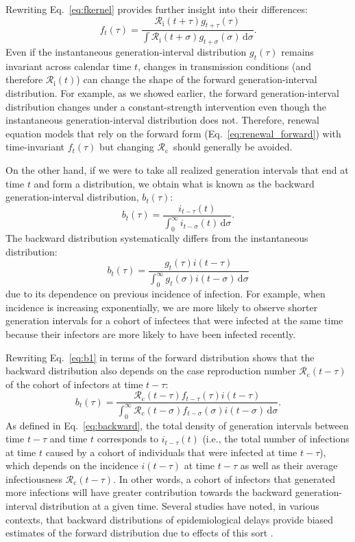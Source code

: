 \documentclass[12pt]{article}
\newcommand{\eref}[1]{Eq.~\ref{eq:#1}}
\newcommand{\Rx}[1]{\ensuremath{{\mathcal R}_{#1}}\xspace}
\newcommand{\Rc}{\Rx{\mathrm{c}}}
\newcommand{\Ri}{\Rx{\mathrm{i}}}
\newcommand{\dd}[1]{\ensuremath{\, \mathrm{d}#1}}
\newcommand{\dsigma}{\dd{\sigma}}
\begin{document}
Rewriting \eref{fkernel} provides further insight into their differences:
\begin{equation}
f_t(\tau) = \frac{\Ri(t + \tau) g_{t+\tau}(\tau)}{\int \Ri(t + \sigma) g_{t+\sigma}(\sigma) \dsigma}.
\end{equation}
Even if the instantaneous generation-interval distribution $g_t(\tau)$ remains invariant across calendar time $t$, changes in transmission conditions (and therefore $\Ri(t)$) can change the shape of the forward generation-interval distribution.
For example, as we showed earlier, the forward generation-interval distribution changes under a constant-strength intervention even though the instantaneous generation-interval distribution does not.
Therefore, renewal equation models that rely on the forward form (\eref{renewal_forward}) with time-invariant $f_t(\tau)$ but changing \Rc\ should generally be avoided.

On the other hand, if we were to take all realized generation intervals that end at time $t$ and form a distribution, we obtain what is known as the backward generation-interval distribution, $b_t(\tau)$:
\begin{equation}
b_t(\tau) = \frac{i_{t-\tau}(t)}{\int_0^\infty i_{t-\sigma}(t) \dsigma}.
\label{eq:backward}
\end{equation}
The backward distribution systematically differs from the instantaneous distribution:
\begin{equation}
b_t(\tau) = \frac{g_t(\tau) i(t-\tau)}{\int_0^\infty g_t(\sigma) i(t-\sigma) \dsigma}
\label{eq:b1}
\end{equation}
due to its dependence on previous incidence of infection.
For example, when incidence is increasing exponentially, we are more likely to observe shorter generation intervals for a cohort of infectees that were infected at the same time because their infectors are more likely to have been infected recently.

Rewriting \eref{b1} in terms of the forward distribution shows that the backward distribution also depends on the case reproduction number $\Rc(t-\tau)$ of the cohort of infectors at time $t-\tau$:
\begin{equation}
b_t(\tau) = \frac{\Rc(t-\tau) f_{t-\tau}(\tau) i(t-\tau)}{\int_0^\infty \Rc(t-\sigma) f_{t-\sigma}(\sigma) i(t-\sigma) \dsigma}.
\label{eq:b2}
\end{equation}
As defined in \eref{backward}, the total density of generation intervals between time $t-\tau$ and time $t$ corresponds to $i_{t-\tau}(t)$ (i.e., the total number of infections at time $t$ caused by a cohort of individuals that were infected at time $t-\tau$), which depends on the incidence $i(t-\tau)$ at time $t-\tau$ as well as their average infectiousness $\Rc(t-\tau)$.
In other words, a cohort of infectors that generated more infections will have greater contribution towards the backward generation-interval distribution at a given time.
Several studies have noted, in various contexts, that backward distributions of epidemiological delays provide biased estimates of the forward distribution due to effects of this sort \citep{nishiura2010time,champredon2015intrinsic,park2020forward}.
\end{document}
